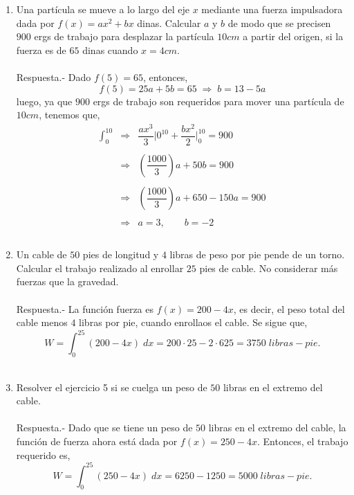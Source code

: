 \begin{enumerate}[ \bfseries 1.]
    \item Una partícula se mueve a lo largo del eje $x$ mediante una fuerza impulsadora dada por $f(x)=ax^2+bx$ dinas. Calcular $a$ y $b$ de modo que se precisen $900$ ergs de trabajo para desplazar la partícula $10cm$ a partir del origen, si la fuerza es de $65$ dinas cuando $x=4cm$.\\\\
	Respuesta.-\; Dado $f(5) = 65$, entonces,
	$$f(5) = 25a + 5b = 65 \; \Longrightarrow \; b=13-5a$$
	luego, ya que $900$ ergs de trabajo son requeridos para mover una partícula de $10cm$, tenemos que,
	$$\begin{array}{rcl}
	    \displaystyle\int_0^{10}&\Longrightarrow&\dfrac{ax^3}{3}\bigg|0^{10} + \dfrac{bx^2}{2}\bigg|_0^{10} = 900\\\\
				    &\Longrightarrow&\left(\dfrac{1000}{3}\right)a + 50b = 900\\\\
				    &\Longrightarrow&\left(\dfrac{1000}{3}\right)a + 650 - 150a=900\\\\
	    &\Longrightarrow&a=3, \qquad b=-2\\\\
	\end{array}$$

    \item Un cable de $50$ pies de longitud y $4$ libras de peso por pie pende de un torno. Calcular el trabajo realizado al enrollar $25$ pies de cable. No considerar más fuerzas que la gravedad.\\\\
	Respuesta.-\; La función fuerza es $f(x)=200-4x$, es decir, el peso total del cable menos $4$ libras por pie, cuando enrollaos el cable. Se sigue que,
	$$W = \int_0^{25} (200-4x)\; dx = 200\cdot 25 - 2\cdot 625 = 3750\; libras-pie.$$\\

    \item Resolver el ejercicio 5 si se cuelga un peso de $50$ libras en el extremo del cable.\\\\
	Respuesta.-\; Dado que se tiene un peso de $50$ libras en el extremo del cable, la función de fuerza ahora está dada por $f(x) = 250-4x$. Entonces, el trabajo requerido es,
	$$W = \int_0^{25} (250-4x)\; dx = 6250-1250 = 5000\; libras-pie.$$\\


\end{enumerate}
